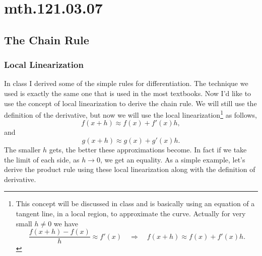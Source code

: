 \documentclass[12pt,addpoints, answers, fleqn]{exam}
\begin{document}
\section{mth.121.03.07}
\subsection{The Chain Rule}


\subsubsection{Local Linearization}

In class I derived some of the simple rules for differentiation. The technique we used is exactly the same one that is used in the most textbooks. Now I'd like to use the concept of local linearization to derive the chain rule. We will still use the definition of the derivative, but now we will use the local linearization\footnote{This concept will be discussed in class and is basically using an equation of a tangent line, in a local region, to approximate the curve. Actually for very small $h \neq 0$ we have
\[
\frac{f \left( x + h \right) - f \left( x\right)}{h} \approx f' \left( x\right) \quad \Rightarrow \quad f \left( x + h \right) \approx f \left( x  \right) + f' \left( x  \right) h.
\]} as follows,
\[
f \left( x + h \right) \approx f \left( x  \right) + f' \left( x  \right) h,
\]
and
\[
g \left( x + h \right) \approx g \left( x  \right) + g' \left( x  \right) h.
\]
The smaller $h$ gets, the better these approximations become. In fact if we take the limit of each side, as $h \rightarrow 0$, we get an equality. As a simple example, let's derive the product rule using these local linearization along with the definition of derivative.
\end{document}
